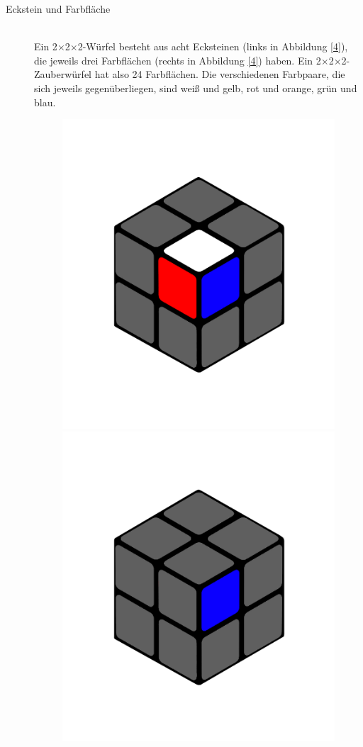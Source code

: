 \documentclass[12pt,a4paper, usenames, dvipsnames]{article}
\theoremstyle{mystyle}
\theoremstyle{definition}
\newcommand{\Ttwo}{2$\times$2$\times$2-}
\begin{document}
\begin{description}
\item[Eckstein und Farbfläche] \ \\
Ein \Ttwo Würfel besteht aus acht Ecksteinen (links in Abbildung \ref{4}), die jeweils drei Farbflächen (rechts in Abbildung \ref{4}) haben. Ein \Ttwo Zauberwürfel hat also 24 Farbflächen. Die verschiedenen Farbpaare, die sich jeweils gegenüberliegen, sind weiß und gelb, rot und orange, grün und blau.
\begin{figure}[h]
\centering
\includegraphics[scale=0.1]{2x2stein.png}
\includegraphics[scale=0.1]{2x2farbflaeche.png}

\end{figure}
\end{description}
\end{document}

